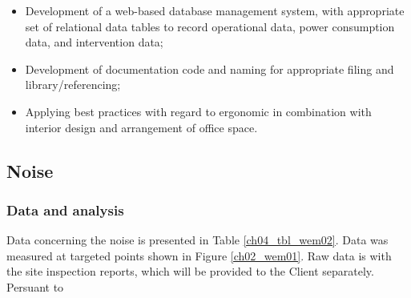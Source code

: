 \begin{itemize}
\item Development of a web-based database management system, with appropriate set of relational data tables to record operational data, power consumption data, and intervention data;

\item Development of documentation code and naming for appropriate filing and library/referencing;

\item Applying best practices with regard to ergonomic in combination with interior design and arrangement of office space.

\end{itemize}





\subsection{Noise}\label{aq06}
\subsubsection{Data and analysis}
Data concerning the noise is presented in Table \ref{ch04_tbl_wem02}. Data was measured at targeted points shown in Figure \ref{ch02_wem01}. Raw data is with the site inspection reports, which will be provided to the Client separately. Persuant to 

